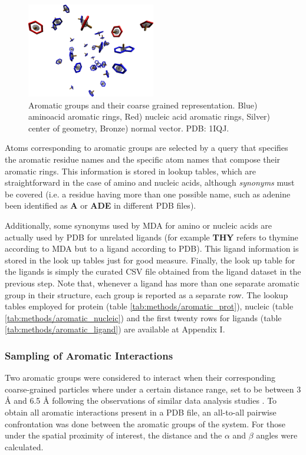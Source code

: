      \begin{figure}[H]
        \centering
        \includegraphics[width=0.5\textwidth]{figures/methods/aromatic.png}
        \caption{\label{fig:methods/aromatic} Aromatic groups and their coarse grained representation. Blue) aminoacid aromatic rings, Red) nucleic acid aromatic rings, Silver) center of geometry, Bronze) normal vector. PDB: 1IQJ.}
      \end{figure}

      Atoms corresponding to aromatic groups are selected by a query that specifies the aromatic residue names and the specific atom names that compose their aromatic rings. This information is stored in lookup tables, which are straightforward in the case of amino and nucleic acids, although \textit{synonyms} must be covered (i.e. a residue having more than one possible name, such as adenine been identified as \textbf{A} or \textbf{ADE} in different PDB files).

      Additionally, some synonyms used by MDA for amino or nucleic acids are actually used by PDB for unrelated ligands (for example \textbf{THY} refers to thymine according to MDA but to a ligand according to PDB). This ligand information is stored in the look up tables just for good measure. Finally, the look up table for the ligands is simply the curated CSV file obtained from the ligand dataset in the previous step. Note that, whenever a ligand has more than one separate aromatic group in their structure, each group is reported as a separate row. The lookup tables employed for protein (table \ref{tab:methods/aromatic_prot}), nucleic (table \ref{tab:methods/aromatic_nucleic}) and the first twenty rows for ligands (table \ref{tab:methods/aromatic_ligand}) are available at Appendix I.

    \subsubsection{Sampling of Aromatic Interactions}
      Two aromatic groups were considered to interact when their corresponding coarse-grained particles where under a certain distance range, set to be between {3 \AA} and {6.5 \AA} following the observations of similar data analysis studies \cite{aromatic_2018}. To obtain all aromatic interactions present in a PDB file, an all-to-all pairwise confrontation was done between the aromatic groups of the system. For those under the spatial proximity of interest, the distance and the $\alpha$ and $\beta$ angles were calculated.

